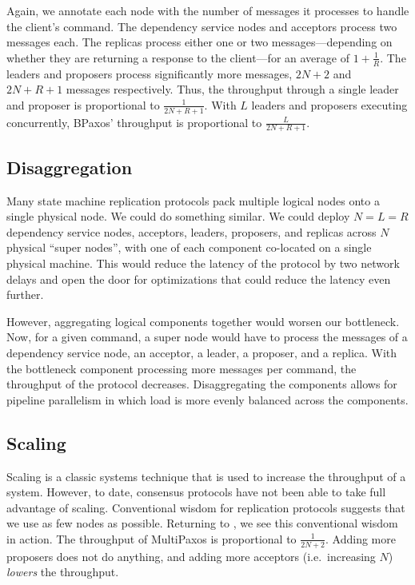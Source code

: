 Again, we annotate each node with the number of messages it processes to handle
the client's command. The dependency service nodes and acceptors process two
messages each. The replicas process either one or two messages---depending on
whether they are returning a response to the client---for an average of
$1+\frac{1}{R}$. The leaders and proposers process significantly more messages,
$2N+2$ and $2N+R+1$ messages respectively. Thus, the throughput through a
single leader and proposer is proportional to $\frac{1}{2N+R+1}$. With $L$
leaders and proposers executing concurrently, BPaxos' throughput is
proportional to $\frac{L}{2N+R+1}$.

\subsection{Disaggregation}
Many state machine replication protocols pack multiple logical nodes onto a
single physical node. We could do something similar. We could deploy $N=L=R$
dependency service nodes, acceptors, leaders, proposers, and replicas across
$N$ physical ``super nodes'', with one of each component co-located on a single
physical machine. This would reduce the latency of the protocol by two network
delays and open the door for optimizations that could reduce the latency even
further.

However, aggregating logical components together would worsen our bottleneck.
Now, for a given command, a super node would have to process the messages of a
dependency service node, an acceptor, a leader, a proposer, and a replica. With
the bottleneck component processing more messages per command, the throughput
of the protocol decreases. Disaggregating the components allows for pipeline
parallelism in which load is more evenly balanced across the components.

\subsection{Scaling}
Scaling is a classic systems technique that is used to increase the throughput
of a system. However, to date, consensus protocols have not been able to take
full advantage of scaling. Conventional wisdom for replication protocols
suggests that we use as few nodes as possible. Returning to
, we see this conventional wisdom in action. The
throughput of MultiPaxos is proportional to $\frac{1}{2N+2}$. Adding more
proposers does not do anything, and adding more acceptors (i.e.\ increasing
$N$) \emph{lowers} the throughput.

